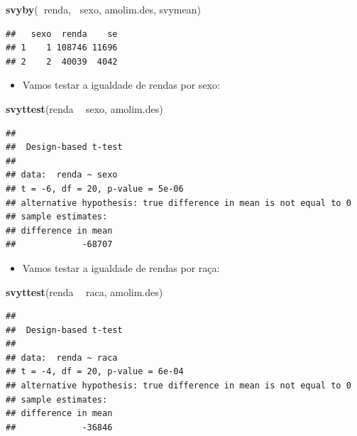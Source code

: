 \documentclass[]{book}
\newenvironment{Shaded}{\begin{snugshade}}{\end{snugshade}}
\newcommand{\KeywordTok}[1]{\textcolor[rgb]{0.13,0.29,0.53}{\textbf{#1}}}
\newcommand{\StringTok}[1]{\textcolor[rgb]{0.31,0.60,0.02}{#1}}
\newcommand{\OperatorTok}[1]{\textcolor[rgb]{0.81,0.36,0.00}{\textbf{#1}}}
\newcommand{\NormalTok}[1]{#1}
\providecommand{\tightlist}{%
  \setlength{\itemsep}{0pt}\setlength{\parskip}{0pt}}
\theoremstyle{definition}
\theoremstyle{definition}
\theoremstyle{definition}
\theoremstyle{remark}
\begin{document}
\begin{Shaded}
\begin{Highlighting}[]
\KeywordTok{svyby}\NormalTok{(}\OperatorTok{~}\NormalTok{renda, }\OperatorTok{~}\NormalTok{sexo, amolim.des, svymean)}
\end{Highlighting}
\end{Shaded}

\begin{verbatim}
##   sexo  renda    se
## 1    1 108746 11696
## 2    2  40039  4042
\end{verbatim}

\begin{itemize}
\tightlist
\item
  Vamos testar a igualdade de rendas por sexo:
\end{itemize}

\begin{Shaded}
\begin{Highlighting}[]
\KeywordTok{svyttest}\NormalTok{(renda }\OperatorTok{~}\StringTok{ }\NormalTok{sexo, amolim.des)}
\end{Highlighting}
\end{Shaded}

\begin{verbatim}
## 
##  Design-based t-test
## 
## data:  renda ~ sexo
## t = -6, df = 20, p-value = 5e-06
## alternative hypothesis: true difference in mean is not equal to 0
## sample estimates:
## difference in mean 
##             -68707
\end{verbatim}

\begin{itemize}
\tightlist
\item
  Vamos testar a igualdade de rendas por raça:
\end{itemize}

\begin{Shaded}
\begin{Highlighting}[]
\KeywordTok{svyttest}\NormalTok{(renda }\OperatorTok{~}\StringTok{ }\NormalTok{raca, amolim.des)}
\end{Highlighting}
\end{Shaded}

\begin{verbatim}
## 
##  Design-based t-test
## 
## data:  renda ~ raca
## t = -4, df = 20, p-value = 6e-04
## alternative hypothesis: true difference in mean is not equal to 0
## sample estimates:
## difference in mean 
##             -36846
\end{verbatim}
\end{document}
